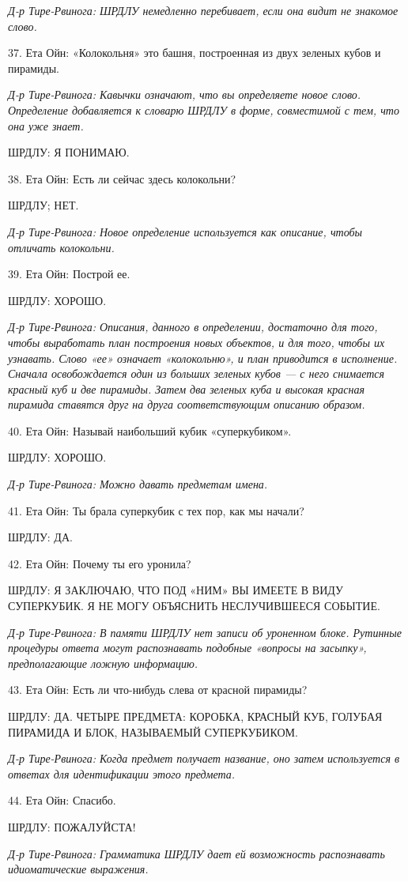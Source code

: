 \documentclass[../main.tex]{subfiles}
\begin{document}
\begin{dialogue}
\emph{Д-р Тире-Рвинога: ШРДЛУ немедленно перебивает, если она видит не знакомое слово.}

37. Ета Ойн: «Колокольня» это башня, построенная из двух зеленых кубов и пирамиды.

\emph{Д-р Тире-Рвинога: Кавычки означают, что вы определяете новое слово. Определение добавляется к словарю ШРДЛУ в форме, совместимой с тем, что она уже знает.}

ШРДЛУ: Я ПОНИМАЮ.

38. Ета Ойн: Есть ли сейчас здесь колокольни?

ШРДЛУ; НЕТ.

\emph{Д-р Тире-Рвинога: Новое определение используется как описание, чтобы отличать колокольни.}

39. Ета Ойн: Построй ее.

ШРДЛУ: ХОРОШО.

\emph{Д-р Тире-Рвинога: Описания, данного в определении, достаточно для того, чтобы выработать план построения новых объектов, и для того, чтобы их узнавать. Слово «ее» означает «колокольню», и план приводится в исполнение. Сначала освобождается один из больших зеленых кубов --- с него снимается красный куб и две пирамиды. Затем два зеленых куба и высокая красная пирамида ставятся друг на друга соответствующим описанию образом.}

40. Ета Ойн: Называй наибольший кубик «суперкубиком».

ШРДЛУ: ХОРОШО.

\emph{Д-р Тире-Рвинога: Можно давать предметам имена.}

41. Ета Ойн: Ты брала суперкубик с тех пор, как мы начали?

ШРДЛУ: ДА.

42. Ета Ойн: Почему ты его уронила?

ШРДЛУ: Я ЗАКЛЮЧАЮ, ЧТО ПОД «НИМ» ВЫ ИМЕЕТЕ В ВИДУ СУПЕРКУБИК. Я НЕ МОГУ ОБЪЯСНИТЬ НЕСЛУЧИВШЕЕСЯ СОБЫТИЕ.

\emph{Д-р Тире-Рвинога: В памяти ШРДЛУ нет записи об уроненном блоке. Рутинные процедуры ответа могут распознавать подобные «вопросы на засыпку», предполагающие ложную информацию.}

43. Ета Ойн: Есть ли что-нибудь слева от красной пирамиды?

ШРДЛУ: ДА. ЧЕТЫРЕ ПРЕДМЕТА: КОРОБКА, КРАСНЫЙ КУБ, ГОЛУБАЯ ПИРАМИДА И БЛОК, НАЗЫВАЕМЫЙ СУПЕРКУБИКОМ.

\emph{Д-р Тире-Рвинога: Когда предмет получает название, оно затем используется в ответах для идентификации этого предмета.}

44. Ета Ойн: Спасибо.

ШРДЛУ: ПОЖАЛУЙСТА!

\emph{Д-р Тире-Рвинога: Грамматика ШРДЛУ дает ей возможность распознавать идиоматические выражения.}

\end{dialogue}
\end{document}
